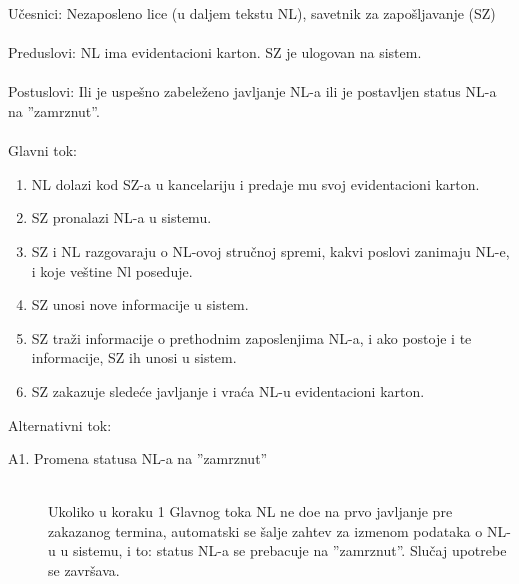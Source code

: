 \noindent U\v cesnici: Nezaposleno lice (u daljem tekstu NL), savetnik za zapo\v sljavanje (SZ)
\\
\\ Preduslovi: NL ima evidentacioni karton. SZ je ulogovan na sistem. 
\\
\\ Postuslovi: Ili je uspe\v sno zabele\v zeno javljanje NL-a ili je postavljen status NL-a na ''zamrznut''.
\\ 
\\ Glavni tok:
\begin{enumerate}
	\item NL dolazi kod SZ-a u kancelariju i predaje mu svoj evidentacioni karton.
	\item SZ pronalazi NL-a u sistemu.
	\item SZ i NL razgovaraju o NL-ovoj stru\v cnoj spremi, kakvi poslovi zanimaju NL-e, i koje ve\v stine Nl poseduje.
	\item SZ unosi nove informacije u sistem.
	\item SZ tra\v zi informacije o prethodnim zaposlenjima NL-a, i ako postoje i te informacije, SZ ih unosi u sistem.
	\item SZ zakazuje slede\' ce javljanje i vra\' ca NL-u evidentacioni karton.
\end{enumerate}

\noindent Alternativni tok:
\begin{description}
	\item[A1. Promena statusa NL-a na ''zamrznut''] ~\\
	Ukoliko u koraku 1 Glavnog toka NL ne do\dj e na prvo javljanje pre zakazanog termina, automatski se \v salje zahtev za izmenom podataka o NL-u u sistemu, i to: status NL-a se prebacuje na ''zamrznut''. Slu\v caj upotrebe se zavr\v sava.
\end{description}


